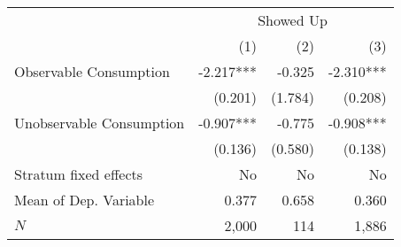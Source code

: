 \begin{tabular}{lrrr}
\toprule
                         &  \multicolumn{3}{c}{Showed Up}  \\ 
\cmidrule(lr){2-4} 
                         &       (1) &     (2) &       (3) \\ 
\midrule
Observable Consumption   & -2.217*** &  -0.325 & -2.310*** \\ 
                         &   (0.201) & (1.784) &   (0.208) \\ 
Unobservable Consumption & -0.907*** &  -0.775 & -0.908*** \\ 
                         &   (0.136) & (0.580) &   (0.138) \\ 
\midrule
Stratum fixed effects    &        No &      No &        No \\ 
Mean of Dep. Variable    &     0.377 &   0.658 &     0.360 \\ 
$N$                      &     2,000 &     114 &     1,886 \\ 
\bottomrule
\end{tabular}
